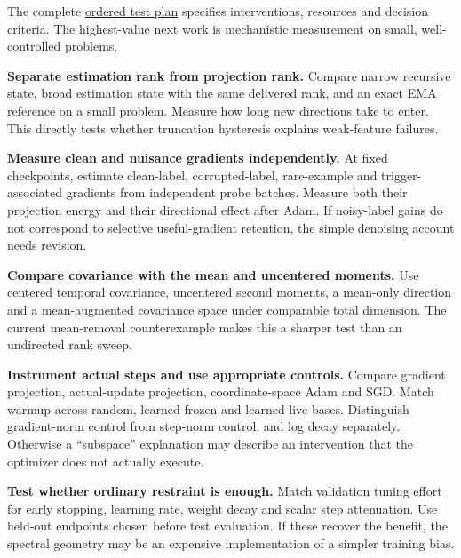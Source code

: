 \documentclass[
  british,
  10pt,
  a4paper,
]{article}
\begin{document}
The complete \hyperref[hypotheses-and-tests]{ordered test plan}
specifies intervention\allowbreak{}s,\allowbreak{} resources and
decision criteria. The highest-\allowbreak{}value next work is
mechanistic measurement on small, well-\allowbreak{}controlled problems.

\textbf{Separate estimation rank from projection rank.} Compare narrow
recursive state, broad estimation state with the same delivered rank,
and an exact EMA reference on a small problem. Measure how long new
directions take to enter. This directly tests whether truncation
hysteresis explains weak-\allowbreak{}feature failures.

\textbf{Measure clean and nuisance gradients
independentl\allowbreak{}y.\allowbreak{}} At fixed
checkpoints,\allowbreak{} estimate
clean-\allowbreak{}label,\allowbreak{}
corrupted-\allowbreak{}label,\allowbreak{} rare-\allowbreak{}example and
trigger-\allowbreak{}associated gradients from independent probe
batches. Measure both their projection energy and their directional
effect after Adam. If noisy-\allowbreak{}label gains do not correspond
to selective useful-\allowbreak{}gradient retention, the simple
denoising account needs revision.

\textbf{Compare covariance with the mean and uncentered moments.} Use
centered temporal covariance,\allowbreak{} uncentered second moments, a
mean-only direction and a mean-\allowbreak{}augmented covariance space
under comparable total dimension. The current mean-\allowbreak{}removal
counterexample makes this a sharper test than an undirected rank sweep.

\textbf{Instrument actual steps and use appropriate controls.} Compare
gradient projection,\allowbreak{} actual-\allowbreak{}update
projection,\allowbreak{} coordinate-\allowbreak{}space Adam and SGD.
Match warmup across random, learned-\allowbreak{}frozen and
learned-\allowbreak{}live bases. Distinguish gradient-\allowbreak{}norm
control from step-norm control, and log decay separately.\allowbreak{}
Otherwise a ``subspace'' explanation may describe an intervention that
the optimizer does not actually execute.

\textbf{Test whether ordinary restraint is enough.} Match validation
tuning effort for early stopping, learning rate, weight decay and scalar
step attenuation.\allowbreak{} Use held-out endpoints chosen before test
evaluation.\allowbreak{} If these recover the benefit, the spectral
geometry may be an expensive implementation of a simpler training bias.
\end{document}
